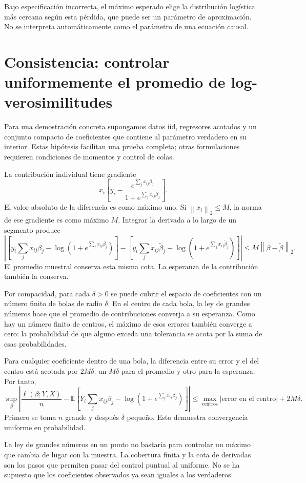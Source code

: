 \documentclass[11pt,a4paper]{article}
\newcommand{\E}{\mathbb E}
\newcommand{\norm}[1]{\left\lVert #1\right\rVert}
\begin{document}
Bajo especificación incorrecta, el máximo esperado elige
la distribución logística más cercana según esta pérdida,
que puede ser un parámetro de aproximación.
No se interpreta automáticamente como el parámetro de
una ecuación causal.

\clearpage
\section{Consistencia: controlar uniformemente el promedio de log-verosimilitudes}\label{logit52}
Para una demostración concreta supongamos datos iid,
regresores acotados y un conjunto compacto de coeficientes que contiene
al parámetro verdadero en su interior.
Estas hipótesis facilitan una prueba completa; otras formulaciones
requieren condiciones de momentos y control de colas.

La contribución individual tiene gradiente
\[
x_i\left[y_i-\frac{e^{\sum_jx_{ij}\beta_j}}
{1+e^{\sum_jx_{ij}\beta_j}}\right].
\]
El valor absoluto de la diferencia es como máximo uno.
Si $\norm{x_i}_2\le M$, la norma de ese gradiente es como máximo $M$.
Integrar la derivada a lo largo de un segmento produce
\[
\left|
\left[y_i\sum_jx_{ij}\beta_j-\log(1+e^{\sum_jx_{ij}\beta_j})\right]
-
\left[y_i\sum_jx_{ij}\widetilde\beta_j
-\log(1+e^{\sum_jx_{ij}\widetilde\beta_j})\right]
\right|\le M\norm{\beta-\widetilde\beta}_2.
\]
El promedio muestral conserva esta misma cota.
La esperanza de la contribución también la conserva.

Por compacidad, para cada $\delta>0$ se puede cubrir el espacio
de coeficientes con un número finito de bolas de radio $\delta$.
En el centro de cada bola, la ley de grandes números hace que el
promedio de contribuciones converja a su esperanza.
Como hay un número finito de centros, el máximo de esos errores
también converge a cero: la probabilidad de que alguno exceda
una tolerancia se acota por la suma de esas probabilidades.

Para cualquier coeficiente dentro de una bola, la diferencia
entre su error y el del centro está acotada por $2M\delta$:
un $M\delta$ para el promedio y otro para la esperanza.
Por tanto,
\[
\sup_\beta\left|
\frac{\ell(\beta;Y,X)}n-
\E\!\left[Y_i\sum_jx_{ij}\beta_j-
\log(1+e^{\sum_jx_{ij}\beta_j})\right]
\right|
\le \max_{\text{centros}}|\text{error en el centro}|+2M\delta.
\]
Primero se toma $n$ grande y después $\delta$ pequeño.
Esto demuestra convergencia uniforme en probabilidad.

La ley de grandes números en un punto no bastaría para controlar
un máximo que cambia de lugar con la muestra.
La cobertura finita y la cota de derivadas son los pasos que
permiten pasar del control puntual al uniforme.
No se ha supuesto que los coeficientes observados ya sean
iguales a los verdaderos.
\end{document}
